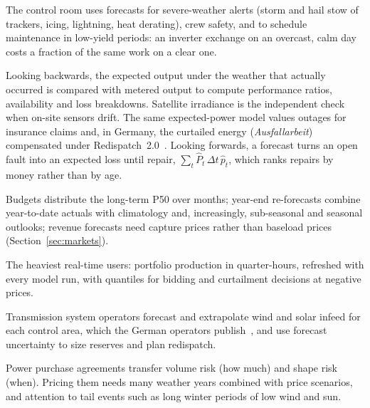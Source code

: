  The control room uses forecasts for severe-weather alerts (storm and hail stow of trackers, icing, lightning, heat derating), crew safety, and to schedule maintenance in low-yield periods: an inverter exchange on an overcast, calm day costs a fraction of the same work on a clear one.

 Looking backwards, the expected output under the weather that actually occurred is compared with metered output to compute performance ratios, availability and loss breakdowns. Satellite irradiance is the independent check when on-site sensors drift. The same expected-power model values outages for insurance claims and, in Germany, the curtailed energy (\emph{Ausfallarbeit}) compensated under Redispatch~2.0~\cite{bdew2021ausfallarbeit}. Looking forwards, a forecast turns an open fault into an expected loss until repair, $\sum_t \hat P_t\,\Delta t\,\hat p_t$, which ranks repairs by money rather than by age.

 Budgets distribute the long-term P50 over months; year-end re-forecasts combine year-to-date actuals with climatology and, increasingly, sub-seasonal and seasonal outlooks; revenue forecasts need capture prices rather than baseload prices (Section~\ref{sec:markets}).

 The heaviest real-time users: portfolio production in quarter-hours, refreshed with every model run, with quantiles for bidding and curtailment decisions at negative prices.

 Transmission system operators forecast and extrapolate wind and solar infeed for each control area, which the German operators publish~\cite{netztransparenz2026projection}, and use forecast uncertainty to size reserves and plan redispatch.

 Power purchase agreements transfer volume risk (how much) and shape risk (when). Pricing them needs many weather years combined with price scenarios, and attention to tail events such as long winter periods of low wind and sun.
